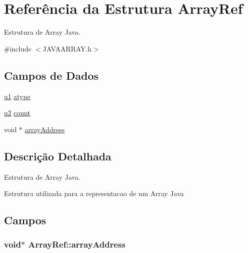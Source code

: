 \hypertarget{struct_array_ref}{}\section{Referência da Estrutura Array\+Ref}
\label{struct_array_ref}


Estrutura de Array Java.  




{\ttfamily \#include $<$J\+A\+V\+A\+A\+R\+R\+A\+Y.\+h$>$}

\subsection*{Campos de Dados}
\begin{DoxyCompactItemize}
\item 
\hyperlink{_e___j_v_m_8h_a216a9f8b04b4f0af84a4ca9d1d85a6ca}{u1} \hyperlink{struct_array_ref_a2fb58babe85ef3d37452e72c3c5c7513}{atype}
\item 
\hyperlink{_e___j_v_m_8h_a5f223212eef04d10a4550ded680cb1cf}{u2} \hyperlink{struct_array_ref_abaaae2def8584a14b087e76d4308aec7}{count}
\item 
void $\ast$ \hyperlink{struct_array_ref_ae8d35b12d681e4e2a69f5f81358c0ec8}{array\+Address}
\end{DoxyCompactItemize}


\subsection{Descrição Detalhada}
Estrutura de Array Java. 

Estrutura utilizada para a representacao de um Array Java 

\subsection{Campos}
\hypertarget{struct_array_ref_ae8d35b12d681e4e2a69f5f81358c0ec8}{}
\subsubsection[{array\+Address}]{\setlength{\rightskip}{0pt plus 5cm}void$\ast$ Array\+Ref\+::array\+Address}\label{struct_array_ref_ae8d35b12d681e4e2a69f5f81358c0ec8}
\hypertarget{struct_array_ref_a2fb58babe85ef3d37452e72c3c5c7513}{}
